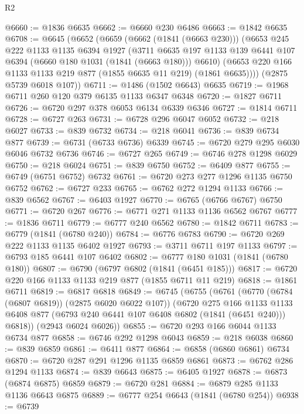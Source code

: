 \begin{lexlean}{R2}
\begin{coremodule}
@6660 := @1836 @6635
@6662 := @6660 @230 @6486
@6663 := @1842 @6635
@6708 := @6645
    (@6652
      (@6659
        (@6662 (@1841 (@6663 @230)))
        (@6653
          @245
          @222
          @1133
          @1135
          @6394
          @1927
          (@3711
            @6635
            @197
            @1133
            @139
            @6441
            @107
            @6394
            (@6660 @180 @1031 (@1841 (@6663 @180)))
            @6610)
          (@6653 @220 @166 @1133 @1133 @219 @877 (@1855 @6635 @11 @219) (@1861 @6635))))
      (@2875 @5739 @6018 @107))
@6711 := @1486 (@1502 @6643) @6635
@6719 := @1968 @6711 @260 @120 @379 @6135 @1133 @6347 @6348
@6720 := @1827 @6711
@6726 := @6720 @297 @378 @6053 @6134 @6339 @6346
@6727 := @1814 @6711
@6728 := @6727 @263
@6731 := @6728 @296 @6047 @6052
@6732 := @218 @6027
@6733 := @839 @6732
@6734 := @218 @6041
@6736 := @839 @6734 @877
@6739 := @6731 (@6733 @6736) @6339
@6745 := @6720 @279 @295 @6030 @6046 @6732 @6736
@6746 := @6727 @265
@6749 := @6746 @278 @1298 @6029
@6750 := @218 @6024
@6751 := @839 @6750
@6752 := @6409 @877
@6755 := @6749 (@6751 @6752) @6732
@6761 := @6720 @273 @277 @1296 @1135 @6750 @6752
@6762 := @6727 @233
@6765 := @6762 @272 @1294 @1133
@6766 := @839 @6562
@6767 := @6403 @1927
@6770 := @6765 (@6766 @6767) @6750
@6771 := @6720 @267
@6776 := @6771 @271 @1133 @1136 @6562 @6767
@6777 := @1836 @6711
@6779 := @6777 @240 @6562
@6780 := @1842 @6711
@6783 := @6779 (@1841 (@6780 @240))
@6784 := @6776 @6783
@6790 := @6720 @269 @222 @1133 @1135 @6402 @1927
@6793 := @3711 @6711 @197 @1133
@6797 := @6793 @185 @6441 @107 @6402
@6802 := @6777 @180 @1031 (@1841 (@6780 @180))
@6807 := @6790 (@6797 @6802 (@1841 (@6451 @185)))
@6817 := @6720 @220 @166 @1133 @1133 @219 @877 (@1855 @6711 @11 @219)
@6818 := @1861 @6711
@6819 := @6817 @6818
@6849 := @6745
    (@6755
      (@6761
        (@6770 (@6784 (@6807 @6819)) (@2875 @6020 @6022 @107))
        (@6720
          @275
          @166
          @1133
          @1133
          @6408
          @877
          (@6793 @240 @6441 @107 @6408 @6802 (@1841 (@6451 @240)))
          @6818))
      (@2943 @6024 @6026))
@6855 := @6720 @293 @166 @6044 @1133 @6734 @877
@6858 := @6746 @292 @1298 @6043
@6859 := @218 @6038
@6860 := @839 @6859
@6861 := @6411 @877
@6864 := @6858 (@6860 @6861) @6734
@6870 := @6720 @287 @291 @1296 @1135 @6859 @6861
@6873 := @6762 @286 @1294 @1133
@6874 := @839 @6643
@6875 := @6405 @1927
@6878 := @6873 (@6874 @6875) @6859
@6879 := @6720 @281
@6884 := @6879 @285 @1133 @1136 @6643 @6875
@6889 := @6777 @254 @6643 (@1841 (@6780 @254))
@6938 := @6739

\end{coremodule}
\end{lexlean}
